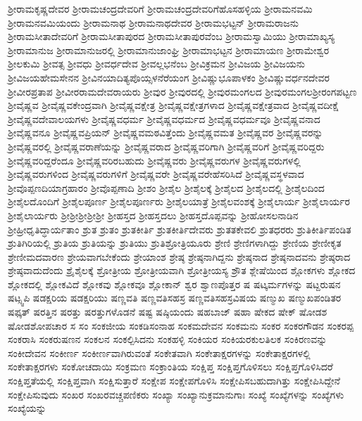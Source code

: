{ಶ್ರೀರಾಮಕೃಷ್ಣದೇವರ
ಶ್ರೀರಾಮಚಂದ್ರದೇವರಿಗೆ
ಶ್ರೀರಾಮಚಂದ್ರದೇವರಿಗೆಹೊಸಹಳ್ಳಿಯ
ಶ್ರೀರಾಮನವಮಿ
ಶ್ರೀರಾಮನವಮಿಯಂದು
ಶ್ರೀರಾಮನಾಥ
ಶ್ರೀರಾಮನಾಥದೇವರ
ಶ್ರೀರಾಮಭಟ್ಟನ್
ಶ್ರೀರಾಮರಾಜನು
ಶ್ರೀರಾಮಸೀತಾದೇವರಿಗೆ
ಶ್ರೀರಾಮಸೀತಾಪುರದ
ಶ್ರೀರಾಮಸೀತಾಪುರವೆಂಬ
ಶ್ರೀರಾಮಸ್ವಾಮಿಯು
ಶ್ರೀರಾಮಾಖ್ಯಸ್ಯ
ಶ್ರೀರಾಮಾನುಜ
ಶ್ರೀರಾಮಾನುಜರಲ್ಲಿ
ಶ್ರೀರಾಮಾನುಜಾಂಘ್ರಿ
ಶ್ರೀರಾಮಾಭಟ್ಟನ
ಶ್ರೀರಾಮಾಯಣ
ಶ್ರೀರಾಮೇಶ್ವರ
ಶ್ರೀಲಕುಮಿ
ಶ್ರೀವತ್ಸ
ಶ್ರೀವಧು
ಶ್ರೀವರ್ಧದೇವ
ಶ್ರೀವಲ್ಲಭನೆಂಬ
ಶ್ರೀವಿಕ್ರಮನ
ಶ್ರೀವಿಜಯ
ಶ್ರೀವಿಜಯನು
ಶ್ರೀವಿಜಯಹೇಮಸೇನನ
ಶ್ರೀವಿನಯಾದಿತ್ಯಪೊಯ್ಸಳನೆರೆಯಂಗ
ಶ್ರೀವಿಷ್ಣುಭೂಪಾಳಕಂ
ಶ್ರೀವಿಷ್ಣುವರ್ಧನದೇವರ
ಶ್ರೀವೀರಪ್ರತಾಪ
ಶ್ರೀವೀರರಾಮದೇವರಾಯರು
ಶ್ರೀವುರ
ಶ್ರೀವುರದಲ್ಲಿ
ಶ್ರೀವುರಮಂಗಲದ
ಶ್ರೀವುರಮಂಗಲಶ್ರೀರಂಗಪಟ್ಟಣ
ಶ್ರೀವೈಷ್ಣವ
ಶ್ರೀವೈಷ್ಣವಕೇಂದ್ರವಾಗಿ
ಶ್ರೀವೈಷ್ಣವಕ್ಷೇತ್ರ
ಶ್ರೀವೈಷ್ಣವಕ್ಷೇತ್ರಗಳಾದ
ಶ್ರೀವೈಷ್ಣವಕ್ಷೇತ್ರವಾದ
ಶ್ರೀವೈಷ್ಣವದೀಕ್ಷೆ
ಶ್ರೀವೈಷ್ಣವದೇವಾಲಯಗಳು
ಶ್ರೀವೈಷ್ಣವಧರ್ಮ
ಶ್ರೀವೈಷ್ಣವಧರ್ಮದ
ಶ್ರೀವೈಷ್ಣವಧರ್ಮವೂ
ಶ್ರೀವೈಷ್ಣವನಾದ
ಶ್ರೀವೈಷ್ಣವನೂ
ಶ್ರೀವೈಷ್ಣವಪ್ರಿಯನ್
ಶ್ರೀವೈಷ್ಣವಮಠವಿತ್ತೆಂದು
ಶ್ರೀವೈಷ್ಣವಮತ
ಶ್ರೀವೈಷ್ಣವರ
ಶ್ರೀವೈಷ್ಣವರನ್ನು
ಶ್ರೀವೈಷ್ಣವರಲ್ಲಿ
ಶ್ರೀವೈಷ್ಣವರಾಣೆಯನ್ನು
ಶ್ರೀವೈಷ್ಣವರಾದ
ಶ್ರೀವೈಷ್ಣವರಿಗಾಗಿ
ಶ್ರೀವೈಷ್ಣವರಿಗೆ
ಶ್ರೀವೈಷ್ಣವರಿದ್ದರು
ಶ್ರೀವೈಷ್ಣವರಿದ್ದರೆಂದೂ
ಶ್ರೀವೈಷ್ಣವರಿರಬಹುದು
ಶ್ರೀವೈಷ್ಣವರು
ಶ್ರೀವೈಷ್ಣವರುಗಳ
ಶ್ರೀವೈಷ್ಣವರುಗಳಲ್ಲಿ
ಶ್ರೀವೈಷ್ಣವರುಗಳಿಂದ
ಶ್ರೀವೈಷ್ಣವರುಗಳಿಗೆ
ಶ್ರೀವೈಷ್ಣವರೇ
ಶ್ರೀವೈಷ್ಣವರೇಹೆಸರಿಸಿದೆ
ಶ್ರೀವೈಷ್ಣವಸ್ಥಳವಾದ
ಶ್ರೀವೊಪ್ಪಣದಿಯಾಗ್ರಹಾರಂ
ಶ್ರೀವೊಪ್ಪಣಾದಿ
ಶ್ರೀಶಂ
ಶ್ರೀಶೈಲ
ಶ್ರೀಶೈಲಕ್ಕೆ
ಶ್ರೀಶೈಲದ
ಶ್ರೀಶೈಲದಲ್ಲಿ
ಶ್ರೀಶೈಲದಿಂದ
ಶ್ರೀಶೈಲದೊಂದಿಗೆ
ಶ್ರೀಶೈಲಪೂರ್ಣ
ಶ್ರೀಶೈಲಪೂರ್ಣರು
ಶ್ರೀಶೈಲಯಾತ್ರೆ
ಶ್ರೀಶೈಲವಂಶಕ್ಕೆ
ಶ್ರೀಶೈಲಾರ್ಯ
ಶ್ರೀಶೈಲಾರ್ಯರ
ಶ್ರೀಶೈಲಾರ್ಯರು
ಶ್ರೀಶ್ರೀಶ್ರೀಶ್ರೀಶ್ರೀ
ಶ್ರೀಹಸ್ತದ
ಶ್ರೀಹಸ್ತದಲು
ಶ್ರೀಹಸ್ತದೊಪ್ಪವನ್ನು
ಶ್ರೀಹೋಸಲನಾಡಿನ
ಶ್ರೀಹ್ರೀಧೃತಿದ್ಧಾರ್ಯತಾಂ
ಶ್ರುತ
ಶ್ರುತಂ
ಶ್ರುತಕೀರ್ತಿ
ಶ್ರುತಕೀರ್ತಿದೇವರು
ಶ್ರುತತಕೇವಲಿ
ಶ್ರುತಧರರು
ಶ್ರುತಿಕೀರ್ತಿಪಂಡಿತ
ಶ್ರುತಿಗಿರಿಯಲ್ಲಿ
ಶ್ರುತಿಯ
ಶ್ರುತಿಯನ್ನು
ಶ್ರುತಿಯು
ಶ್ರುತಿಶ್ರೋತ್ರಿಯೂರು
ಶ್ರೇಣಿ
ಶ್ರೇಣಿಗಳಾಗಿದ್ದು
ಶ್ರೇಣಿಯ
ಶ್ರೇಣೀಕೃತ
ಶ್ರೇಣೀಮದವಾರಣ
ಶ್ರೇಯವಾಗಬೇಕೆಂದು
ಶ್ರೇಯಾಂಶ
ಶ್ರೇಷ್ಠ
ಶ್ರೇಷ್ಠನಾಗಿದ್ದನು
ಶ್ರೇಷ್ಠನಾದ
ಶ್ರೇಷ್ಠನಾದವನು
ಶ್ರೇಷ್ಠರಾದ
ಶ್ರೇಷ್ಠವಾದುದೆಂದು
ಶ್ರೈಶೈಲಕ್ಕೆ
ಶ್ರೋತ್ರೀಯ
ಶ್ರೋತ್ರೀಯವಾಗಿ
ಶ್ರೋತ್ರೀಯಸ್ಯ
ಶ್ರೌತ
ಶ್ಲೇಷೆಯಿಂದ
ಶ್ಲೋಕಗಳು
ಶ್ಲೋಕದ
ಶ್ಲೋಕದಲ್ಲಿ
ಶ್ಲೋಕವಿದೆ
ಶ್ಲೋಕವು
ಶ್ಲೋಕವೂ
ಶ್ಲೋಕಾನ್
ಶ್ವರ
ಶ್ವಾಣಪೊತ್ತರ
ಷ
ಷಟ್ಕರ್ಮಗಳನ್ನು
ಷಟ್ದರುಷನ
ಷಟ್ಸ್ವಪಿ
ಷಡಕ್ಷರಿಯ
ಷಡಕ್ಷರಿಯು
ಷಣ್ಣವತಿ
ಷಣ್ಣವತಿಸಹಸ್ರ
ಷಣ್ಣವತಿಸಹಸ್ರವಿಷಯ
ಷಣ್ಮುಖ
ಷಣ್ಮುಖಪಂಡಿತರ
ಷಫ್ಕತ್
ಷರತ್ತಿನ
ಷರತ್ತು
ಷರತ್ತುಗಳೊಡನೆ
ಷಷ್ಟ
ಷಷ್ಠಿಯಂದು
ಷಹಬಾಜ್
ಷಹಾ
ಷೇಕದ
ಷೇಕ್
ಷೋಡಶ
ಷೋಡಶೋಪಚಾರ
ಸ
ಸಂ
ಸಂಕಜೀಯ
ಸಂಕಡಿಸಂನಾಹ
ಸಂಕಮದೇವನ
ಸಂಕಮನು
ಸಂಕರ
ಸಂಕರಗೌಡನ
ಸಂಕರಪ್ಪ
ಸಂಕರಾಸಿ
ಸಂಕರುಷಣನ
ಸಂಕಲನ
ಸಂಕಲ್ಪಿಸಿದನು
ಸಂಕಹಳ್ಳಿ
ಸಂಕಿಯರ
ಸಂಕಿಯರಕುಲತಿಲಕ
ಸಂಕಿರಣವನ್ನು
ಸಂಕೀದೇವನ
ಸಂಕೀರ್ಣ
ಸಂಕೀರ್ಣವಾಗಿರುವಂತೆ
ಸಂಕೇತವಾಗಿ
ಸಂಕೇತಾಕ್ಷರಗಳನ್ನು
ಸಂಕೇತಾಕ್ಷರಗಳಲ್ಲಿ
ಸಂಕೇತಾಕ್ಷರಗಳು
ಸಂಕೋಚದಾಯಿ
ಸಂಕ್ರಮಣ
ಸಂಕ್ರಾಂತಿಯ
ಸಂಕ್ಷಿಪ್ತ
ಸಂಕ್ಷಿಪ್ತಗೊಳಿಸಲು
ಸಂಕ್ಷಿಪ್ತಗೊಳಿಸಿದರೆ
ಸಂಕ್ಷಿಪ್ತತೆಯಲ್ಲಿ
ಸಂಕ್ಷಿಪ್ತವಾಗಿ
ಸಂಕ್ಷಿಸುತ್ತಾರೆ
ಸಂಕ್ಷೇಪ
ಸಂಕ್ಷೇಪಗೊಳಿಸಿ
ಸಂಕ್ಷೇಪಿಸಬಹುದಾಗಿತ್ತು
ಸಂಕ್ಷೇಪಿಸಿದ್ದೇನೆ
ಸಂಕ್ಷೇಪಿಸುವುದು
ಸಂಖರ
ಸಂಖರವಚ್ಚಪಣಿಕರು
ಸಂಖ್ಯಾ
ಸಂಖ್ಯಾನುಕ್ರಮಾನುಗಾಃ
ಸಂಖ್ಯೆ
ಸಂಖ್ಯೆಗಳನ್ನು
ಸಂಖ್ಯೆಗಳು
ಸಂಖ್ಯೆಯನ್ನು
}

